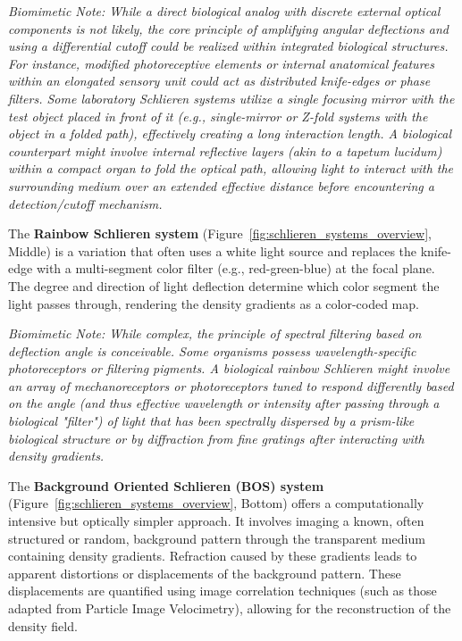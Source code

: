 \documentclass[11pt]{article}
\begin{document}
     \textit{Biomimetic Note: While a direct biological analog with discrete external optical components is not likely, the core principle of amplifying angular deflections and using a differential cutoff could be realized within integrated biological structures. For instance, modified photoreceptive elements or internal anatomical features within an elongated sensory unit could act as distributed knife-edges or phase filters. Some laboratory Schlieren systems utilize a single focusing mirror with the test object placed in front of it (e.g., single-mirror or Z-fold systems with the object in a folded path), effectively creating a long interaction length. A biological counterpart might involve internal reflective layers (akin to a tapetum lucidum) within a compact organ to fold the optical path, allowing light to interact with the surrounding medium over an extended effective distance before encountering a detection/cutoff mechanism.}

The \textbf{Rainbow Schlieren system} (Figure~\ref{fig:schlieren_systems_overview}, Middle) is a variation that often uses a white light source and replaces the knife-edge with a multi-segment color filter (e.g., red-green-blue) at the focal plane. The degree and direction of light deflection determine which color segment the light passes through, rendering the density gradients as a color-coded map.

     \textit{Biomimetic Note: While complex, the principle of spectral filtering based on deflection angle is conceivable. Some organisms possess wavelength-specific photoreceptors or filtering pigments. A biological rainbow Schlieren might involve an array of mechanoreceptors or photoreceptors tuned to respond differently based on the angle (and thus effective wavelength or intensity after passing through a biological "filter") of light that has been spectrally dispersed by a prism-like biological structure or by diffraction from fine gratings after interacting with density gradients.}

The \textbf{Background Oriented Schlieren (BOS) system} (Figure~\ref{fig:schlieren_systems_overview}, Bottom) offers a computationally intensive but optically simpler approach. It involves imaging a known, often structured or random, background pattern through the transparent medium containing density gradients. Refraction caused by these gradients leads to apparent distortions or displacements of the background pattern. These displacements are quantified using image correlation techniques (such as those adapted from Particle Image Velocimetry), allowing for the reconstruction of the density field.
\end{document}
